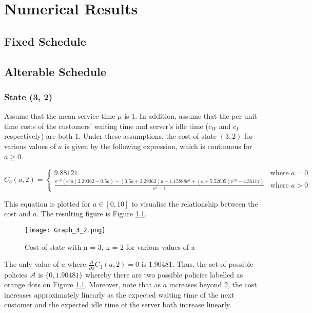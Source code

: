 \chapter{Numerical Results}

\section{Fixed Schedule}

\section{Alterable Schedule}

\subsection{State (3, 2)}

Assume that the mean service time $\mu$ is $1$. In addition, assume that the per unit time costs of the customers' waiting time and server's idle time ($c_{W}$ and $c_{I}$ respectively) are both $1$. Under these assumptions, the cost of state $(3, 2)$ for various values of $a$ is given by the following expression, which is continuous for $a \geq 0$.

\begin{equation*}
	C_{3} (a, 2) =
	\begin{cases}
 		9.88121 & \text{where $a = 0$} \\
 		\frac{\mathrm{e}^{-a} \left( \mathrm{e}^{a} a (2.29362 - 0.5 a) - (0.5 a + 3.29362) a - 1.15888 \mathrm{e}^{a} + (a + 5.52005) \mathrm{e}^{2 a} - 4.36117 \right)}{\mathrm{e}^{a} - 1} & \text{where $a > 0$}
	\end{cases}
\end{equation*}

This equation is plotted for $a \in [0, 10]$ to visualise the relationship between the cost and $a$. The resulting figure is Figure \ref{Graph_3_2}.

\begin{figure}[htb]
	\centering
	\texttt{[image: Graph\_3\_2.png]}
	\caption{Cost of state with n = 3, k = 2 for various values of a}
	\label{Graph_3_2}
\end{figure}

The only value of $a$ where $\frac{\partial}{\partial a} C_{3} (a, 2) = 0$ is $1.90481$. Thus, the set of possible policies $\mathcal{A}$ is $\{ 0, 1.90481 \}$ whereby there are two possible policies labelled as orange dots on Figure \ref{Graph_3_2}. Moreover, note that as $a$ increases beyond 2, the cost increases approximately linearly as the expected waiting time of the next customer and the expected idle time of the server both increase linearly.


